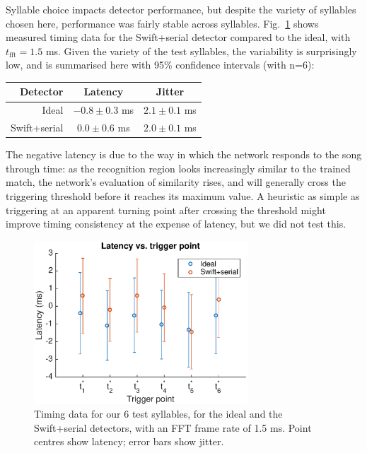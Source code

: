 \documentclass[10pt,letterpaper]{article}
\newcommand\fig[1]{Fig.~\ref{#1}}
\begin{document}
Syllable choice impacts detector performance, but despite the variety
of syllables chosen here, performance was fairly stable across
syllables.  \fig{fig:TimingVsSyllable} shows measured timing data for
the Swift+serial detector compared to the ideal, with
$t_{\textrm{fft}}=1.5$ ms.  Given the variety of the test syllables,
the variability is surprisingly low, and is summarised here with 95\%
confidence intervals (with n=6):
\vspace{8pt}\par\noindent
\begin{tabular}{r|cc}
  Detector & Latency & Jitter \\ 
  \hline   Ideal & $-0.8\pm 0.3$ ms & $2.1\pm 0.1$ ms \\
  Swift+serial & $0.0\pm 0.6$ ms & $2.0\pm 0.1$ ms
\end{tabular}
\vspace{8pt}\par\noindent
The negative latency is due to the way in which the network responds
to the song through time: as the recognition region looks increasingly
similar to the trained match, the network's evaluation of similarity
rises, and will generally cross the triggering threshold before it
reaches its maximum value.  A heuristic as simple as triggering at an
apparent turning point after crossing the threshold might improve
timing consistency at the expense of latency, but we did not test this.

\begin{figure}
  \begin{center}
    \includegraphics[width=8cm]{Fig5}
  \end{center}
  \caption{Timing data for our 6 test syllables, for the ideal and the
    Swift+serial detectors, with an FFT frame rate of 1.5 ms.  Point
    centres show latency; error bars show jitter.}
  \label{fig:TimingVsSyllable}
\end{figure}
\end{document}
